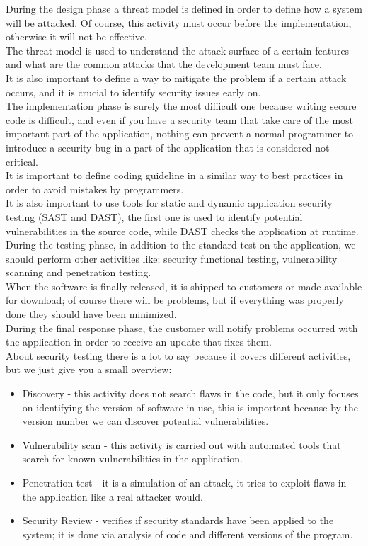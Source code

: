 During the design phase a threat model is defined in order to define how a system will be attacked. Of course, this
activity must occur before the implementation, otherwise it will not be effective.\\
The threat model is used to understand the attack surface of a certain features and what are the common attacks that
the development team must face.\\
It is also important to define a way to mitigate the problem if a certain attack occurs, and it is crucial to identify
security issues early on.\\

The implementation phase is surely the most difficult one because writing secure code is difficult, and even if you have
a security team that take care of the most important part of the application, nothing can prevent a normal programmer to introduce a security bug in a part of the application that is considered not critical.\\
It is important to define coding guideline in a similar way to best practices in order to avoid mistakes by programmers.\\
It is also important to use tools for static and dynamic application security testing (SAST and DAST), the first one is used to
identify potential vulnerabilities in the source code, while DAST checks the application at runtime.\\

During the testing phase, in addition to the standard test on the application, we should perform other activities like:
security functional testing, vulnerability scanning and penetration testing.\\ 

When the software is finally released, it is shipped to customers or made available for download; of course there will be
problems, but if everything was properly done they should have been minimized.\\
During the final response phase, the customer will notify problems occurred with the application in order to receive
an update that fixes them.\\

About security testing there is a lot to say because it covers different activities, but we just give you a small overview:
\begin{itemize}
	\item Discovery - this activity does not search flaws in the code, but it only focuses on identifying the version of software in use, this is important because by the version number we can discover potential vulnerabilities.
	\item Vulnerability scan - this activity is carried out with automated tools that search for
	known vulnerabilities in the application.
	\item Penetration test - it is a simulation of an attack, it tries to exploit flaws in the application like a real attacker would.
	\item Security Review - verifies if security standards have been applied to the system; it is
	done via analysis of code and different versions of the program.
\end{itemize}


